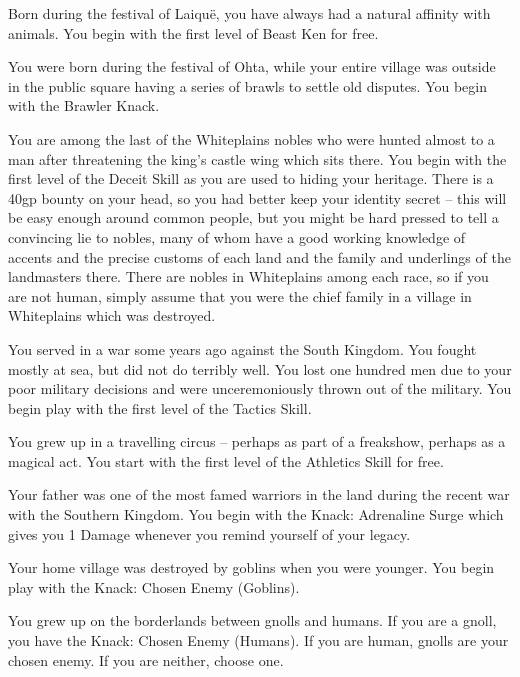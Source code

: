 \begin{multicols}{2}
\begin{list}{\addtocounter{list}{1}\textbf{:}}{\raggedleft}
	\item
	Born during the festival of Laiqu\"{e}, you have always had a natural affinity with animals.
	You begin with the first level of Beast Ken for free.

	\item
	You were born during the festival of Ohta, while your entire village was outside in the public square having a series of brawls to settle old disputes.
	You begin with the Brawler Knack.

	\item
	You are among the last of the Whiteplains nobles who were hunted almost to a man after threatening the king's castle wing which sits there.
	You begin with the first level of the Deceit Skill as you are used to hiding your heritage.
	There is a 40gp bounty on your head, so you had better keep your identity secret -- this will be easy enough around common people, but you might be hard pressed to tell a convincing lie to nobles, many of whom have a good working knowledge of accents and the precise customs of each land and the family and underlings of the landmasters there.
	There are nobles in Whiteplains among each race, so if you are not human, simply assume that you were the chief family in a village in Whiteplains which was destroyed.

\item{You served in a war some years ago against the South Kingdom.  You fought mostly at sea, but did not do terribly well.  You lost one hundred men due to your poor military decisions and were unceremoniously thrown out of the military.  You begin play with the first level of the Tactics Skill.}

	\item
	You grew up in a travelling circus -- perhaps as part of a freakshow, perhaps as a magical act.
	You start with the first level of the Athletics Skill for free.

	\item
	Your father was one of the most famed warriors in the land during the recent war with the Southern Kingdom.
	You begin with the Knack: Adrenaline Surge which gives you 1 Damage whenever you remind yourself of your legacy.

	\item
	Your home village was destroyed by goblins when you were younger.
	You begin play with the Knack: Chosen Enemy (Goblins).

	\item
	You grew up on the borderlands between gnolls and humans.
	If you are a gnoll, you have the Knack: Chosen Enemy (Humans).
	If you are human, gnolls are your chosen enemy.
	If you are neither, choose one.


\end{list}
\end{multicols}
